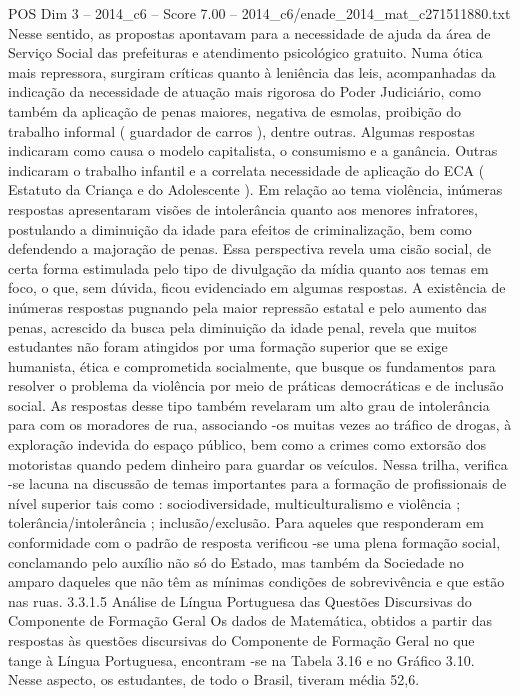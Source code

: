 \begin{textsample}{POS Dim 3 – 2014\_c6 – Score 7.00 – 2014\_c6/enade\_2014\_mat\_c271511880.txt}
Nesse sentido, as propostas apontavam para a necessidade de ajuda da área de Serviço Social das prefeituras e atendimento psicológico gratuito.
Numa ótica mais repressora, surgiram críticas quanto à leniência das leis, acompanhadas da indicação da necessidade de atuação mais rigorosa do Poder Judiciário, como também da aplicação de penas maiores, negativa de esmolas, proibição do trabalho informal ( guardador de carros ), dentre outras.
Algumas respostas indicaram como causa o modelo capitalista, o consumismo e a ganância.
Outras indicaram o trabalho infantil e a correlata necessidade de aplicação do ECA ( Estatuto da Criança e do Adolescente ).
Em relação ao tema violência, inúmeras respostas apresentaram visões de intolerância quanto aos menores infratores, postulando a diminuição da idade para efeitos de criminalização, bem como defendendo a majoração de penas.
Essa perspectiva revela uma cisão social, de certa forma estimulada pelo tipo de divulgação da mídia quanto aos temas em foco, o que, sem dúvida, ficou evidenciado em algumas respostas.
A existência de inúmeras respostas pugnando pela maior repressão estatal e pelo aumento das penas, acrescido da busca pela diminuição da idade penal, revela que muitos estudantes não foram atingidos por uma formação superior que se exige humanista, ética e comprometida socialmente, que busque os fundamentos para resolver o problema da violência por meio de práticas democráticas e de inclusão social.
As respostas desse tipo também revelaram um alto grau de intolerância para com os moradores de rua, associando -os muitas vezes ao tráfico de drogas, à exploração indevida do espaço público, bem como a crimes como extorsão dos motoristas quando pedem dinheiro para guardar os veículos.
Nessa trilha, verifica -se lacuna na discussão de temas importantes para a formação de profissionais de nível superior tais como : sociodiversidade, multiculturalismo e violência ; tolerância/intolerância ; inclusão/exclusão.
Para aqueles que responderam em conformidade com o padrão de resposta verificou -se uma plena formação social, conclamando pelo auxílio não só do Estado, mas também da Sociedade no amparo daqueles que não têm as mínimas condições de sobrevivência e que estão nas ruas. 3.3.1.5 Análise de Língua Portuguesa das Questões Discursivas do Componente de Formação Geral Os dados de Matemática, obtidos a partir das respostas às questões discursivas do Componente de Formação Geral no que tange à Língua Portuguesa, encontram -se na Tabela 3.16 e no Gráfico 3.10.
Nesse aspecto, os estudantes, de todo o Brasil, tiveram média 52,6.

\end{textsample}
